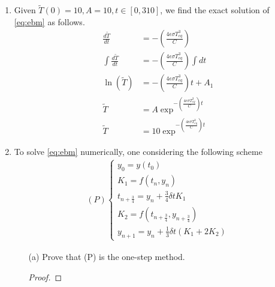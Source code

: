 \documentclass[12pt,a4paper]{article}
\begin{document}
\begin{enumerate}
\begin{proof}
\begin{align*}
        &=  \frac{(1-\alpha) S_0}{4}     -  \epsilon  \sigma   T_{eq}^4      \left(      1 + \frac{4\tilde{T}}{T_{eq}}  \right)\\
        &=  \frac{(1-\alpha) S_0}{4}     -  \epsilon  \sigma   T_{eq}^4      \left(     4 \epsilon   \sigma   T_{eq}^3    \right) \tilde{T}\\
        \implies C \frac{d \tilde{T}}{dt}   &=  -  \left(     4 \epsilon   \sigma   T_{eq}^3    \right) \tilde{T}\\
       \implies   \frac{d \tilde{T}}{dt}    &=   -  \left(     \frac{
       4 \epsilon   \sigma   T_{eq}^3}{C}    \right) \tilde{T}
    \end{align*}
\end{proof}
\item Given $\tilde{T}(0) = 10, A  =  10,  t \in [0,310] $, we  find the exact solution of \eqref{eq:ebm} as follows.
\begin{align*}
\frac{d \tilde{T}}{dt}    &=   -  \left(     \frac{
       4 \epsilon   \sigma   T_{eq}^3}{C}    \right) \\
       \int \frac{d \tilde{T}}{dt}    &=   -  \left(     \frac{
       4 \epsilon   \sigma   T_{eq}^3}{C}    \right) \int dt \\
       \ln(\tilde{T})   &=   -  \left(     \frac{
       4 \epsilon   \sigma   T_{eq}^3}{C}    \right) t + A_1\\
       \tilde{T}  &=      A \exp^{  -  \left(     \frac{
       4 \epsilon   \sigma   T_{eq}^3}{C}    \right) t      }\\
       \tilde{T}  &=  10   \exp^{  -  \left(     \frac{
       4 \epsilon   \sigma   T_{eq}^3}{C}    \right) t      }
\end{align*}
\item To solve \eqref{eq:ebm} numerically,  one considering the following scheme
\begin{align*}
(P) \left\{
                \begin{array}{ll}
               			y_0  =  y(t_0)\\
               			K_1 =  f(t_n,y_n)\\
               			t_{n  + \frac{3}{4}}  = y_n  + \frac{3}{4}  \delta t  K_1\\
               			K_2  =   f  (t_{n  + \frac{3}{4}}   ,   y_{n  + \frac{3}{4}})\\
               			y_{n+1}   =   y_n  + \frac{1}{3}  \delta t  (K_1  + 2 K_2)
                \end{array}
              \right.
\end{align*}
\begin{enumerate}
			\item[(a)] Prove that (P) is the one-step method.
				\begin{proof}
				         

\end{proof}
\end{enumerate}
\end{enumerate}
\end{document}
